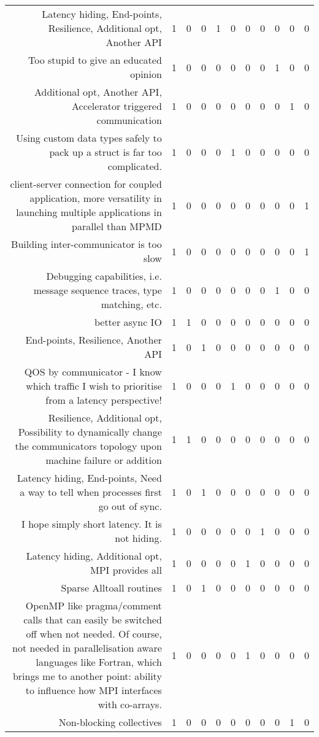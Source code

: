 {\begin{landscape}
\begin{longtable}[htb]{r|c|c|c|c|c|c|c|c|c|c}
{Latency hiding, End-points, Resilience, Additional opt, Another API} & 1 & 0 & 0 & 1 & 0 & 0 & 0 & 0 & 0 & 0 \\%
{Too stupid to give an educated opinion} & 1 & 0 & 0 & 0 & 0 & 0 & 0 & 1 & 0 & 0 \\%
{Additional opt, Another API, Accelerator triggered communication} & 1 & 0 & 0 & 0 & 0 & 0 & 0 & 0 & 1 & 0 \\%
{Using custom data types safely to pack up a struct is far too complicated.} & 1 & 0 & 0 & 0 & 1 & 0 & 0 & 0 & 0 & 0 \\%
{client-server connection for coupled application, more versatility in launching multiple applications in parallel than MPMD} & 1 & 0 & 0 & 0 & 0 & 0 & 0 & 0 & 0 & 1 \\%
{Building inter-communicator is too slow} & 1 & 0 & 0 & 0 & 0 & 0 & 0 & 0 & 0 & 1 \\%
{Debugging capabilities, i.e. message sequence traces, type matching, etc.} & 1 & 0 & 0 & 0 & 0 & 0 & 0 & 1 & 0 & 0 \\%
{better async IO} & 1 & 1 & 0 & 0 & 0 & 0 & 0 & 0 & 0 & 0 \\%
{End-points, Resilience, Another API} & 1 & 0 & 1 & 0 & 0 & 0 & 0 & 0 & 0 & 0 \\%
{QOS by communicator - I know which traffic I wish to prioritise from a latency perspective!} & 1 & 0 & 0 & 0 & 1 & 0 & 0 & 0 & 0 & 0 \\%
{Resilience, Additional opt, Possibility to dynamically change the communicators topology upon machine failure or addition} & 1 & 1 & 0 & 0 & 0 & 0 & 0 & 0 & 0 & 0 \\%
{Latency hiding, End-points, Need a way to tell when processes first go out of sync.} & 1 & 0 & 1 & 0 & 0 & 0 & 0 & 0 & 0 & 0 \\%
{I hope simply short latency.  It is not hiding.} & 1 & 0 & 0 & 0 & 0 & 0 & 1 & 0 & 0 & 0 \\%
{Latency hiding, Additional opt, MPI provides all} & 1 & 0 & 0 & 0 & 0 & 1 & 0 & 0 & 0 & 0 \\%
{Sparse Alltoall routines} & 1 & 0 & 1 & 0 & 0 & 0 & 0 & 0 & 0 & 0 \\%
{OpenMP like pragma/comment calls that can easily be switched off when not needed. Of course, not needed in parallelisation aware languages like Fortran, which brings me to another point: ability to influence how MPI interfaces with co-arrays.} & 1 & 0 & 0 & 0 & 0 & 1 & 0 & 0 & 0 & 0 \\%
{Non-blocking collectives} & 1 & 0 & 0 & 0 & 0 & 0 & 0 & 0 & 1 & 0 \\%

\end{longtable}
\end{landscape}}

